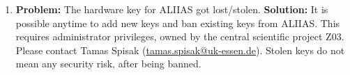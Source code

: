 \begin{enumerate}
     \item \label{faq:lostkey} \textbf{Problem:}
    The hardware key for ALIIAS got lost/stolen.
    \newline
    \textbf{Solution:}
    It is possible anytime to add new keys and ban existing keys from ALIIAS. This requires administrator privileges, owned by the central scientific project Z03. Please contact Tamas Spisak (\href{mailto:tamas.spisak@uk-essen.de}{\color{pniblue}tamas.spisak@uk-essen.de}). Stolen keys do not mean any security risk, after being banned.
    
\end{enumerate}

